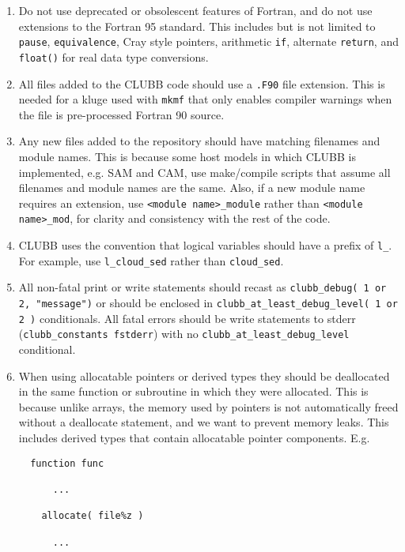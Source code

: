 \documentclass[letterpaper,12pt]{article}
\begin{document}
\begin{enumerate}
\item Do not use deprecated or obsolescent features of Fortran, and do not
use extensions to the Fortran 95 standard.  This includes but is not limited to
\texttt{pause}, \texttt{equivalence}, Cray style pointers, 
arithmetic \texttt{if}, alternate \texttt{return}, and \texttt{float()} for 
real data type conversions.

\item All files added to the CLUBB code should use a \texttt{.F90} file 
extension.  This is needed for a kluge used with \texttt{mkmf} that only enables
compiler warnings when the file is pre-processed Fortran 90 source. 

\item Any new files added to the repository should have matching filenames and module names. 
This is because some host models in which CLUBB is implemented, e.g. SAM and CAM, use 
make/compile scripts that assume all filenames and module names are the same.
Also, if a new module name requires an extension, use \verb|<module name>_module|
rather than \verb|<module name>_mod|, for clarity and consistency with the rest of the code. 

\item CLUBB uses the convention that logical variables should have a prefix of \verb|l_|.  For example,
use \verb|l_cloud_sed| rather than \verb|cloud_sed|.

\item All non-fatal print or write statements should recast as \verb|clubb_debug( 1 or 2, "message")| or
should be enclosed in \verb|clubb_at_least_debug_level( 1 or 2 )| conditionals. All fatal errors should
be write statements to stderr (\verb|clubb_constants fstderr|) with no \verb|clubb_at_least_debug_level| conditional.

\item When using allocatable pointers or derived types they should be deallocated in the same function or subroutine 
in which they were allocated.  This is because unlike arrays, the memory used by pointers is not 
automatically freed without a deallocate statement, and we want to prevent memory leaks. This includes 
derived types that contain allocatable pointer components. E.g. \\
\begin{verbatim}
  function func

      ...

    allocate( file%z )

      ...


\end{verbatim}
\end{enumerate}
\end{document}
